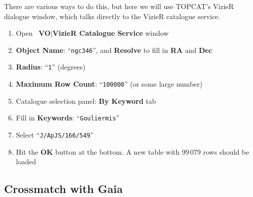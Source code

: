 \documentclass{article}
\newcommand{\buttimg}[1]
           {\mbox{\vtop{\vskip-2ex\hbox{\texttt{[image: \#1]}}}}}
\newcommand{\winfig}[2]
           {\vspace*{-0.5cm}
            \hspace*{0.5cm}\mbox{\vtop{\hbox{\texttt{[image: \#2]}}}}}
\newcommand{\lab}[1]{{\bf #1}}
\newcommand{\mb}[3]{\buttimg{#1}~\lab{#2}$\mid$\lab{#3}}
\newcommand{\entry}[2]{\lab{#1}: ``{\tt #2}''}
\begin{document}
\begin{minipage}[t]{11cm}
  \raggedright
  There are various ways to do this, but here
  we will use TOPCAT's VizieR dialogue window,
  which talks directly to the VizieR catalogue service.
  \begin{enumerate}
  \item Open \mb{vizier_button.png}{VO}{VizieR Catalogue Service} window
  \item \entry{Object Name}{ngc346}, and \lab{Resolve} to fill in
        \lab{RA} and \lab{Dec}
  \item \entry{Radius}{1} (degrees)
  \item \entry{Maximum Row Count}{100000} (or some large number)
  \item Catalogue selection panel: \lab{By Keyword} tab
  \item Fill in \entry{Keywords}{Gouliermis}
  \item Select ``{\tt J/ApJS/166/549}''
  \item Hit the \lab{OK} button at the bottom.
        A new table with 99\,079 rows should be loaded
  \end{enumerate}
\end{minipage}
\begin{minipage}[t]{8cm}
  \vspace*{-1cm}
  \winfig{width=8cm}{n3_vizier.png}
\end{minipage}


\subsection{Crossmatch with Gaia}
\label{sec:cdsxmatch}
\end{document}
